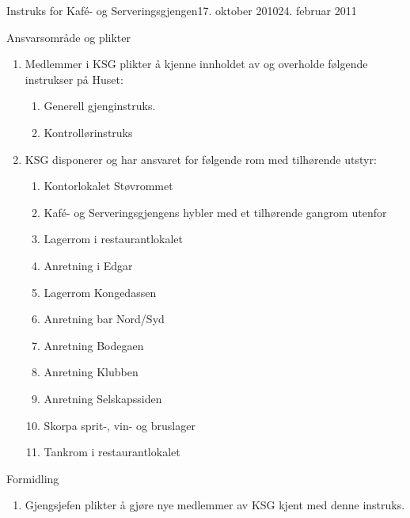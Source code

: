 \begin{instruks}{Instruks for Kaf\'e- og Serveringsgjengen}{17. oktober 2010}{24. februar 2011}
    \begin{instruksledd}{Ansvarsområde og plikter}
        \begin{enumerate}
            \item  Medlemmer i KSG plikter å kjenne innholdet av og overholde følgende instrukser på
                Huset:
                \begin{enumerate}
                    \item Generell gjenginstruks.
                    \item Kontrollørinstruks
                \end{enumerate}
            \item KSG disponerer og har ansvaret for følgende rom med tilhørende utstyr:
                \begin{enumerate}
                    \item Kontorlokalet Støvrommet
                    \item Kafé- og Serveringsgjengens hybler med et tilhørende gangrom utenfor
                    \item Lagerrom i restaurantlokalet
                    \item Anretning i Edgar
                    \item Lagerrom Kongedassen
                    \item Anretning bar Nord/Syd
                    \item Anretning Bodegaen
                    \item Anretning Klubben
                    \item Anretning Selskapssiden
                    \item Skorpa sprit-, vin- og bruslager
                    \item Tankrom i restaurantlokalet
                \end{enumerate}
        \end{enumerate}
    \end{instruksledd}

    \begin{instruksledd}{Formidling}
        \begin{enumerate}
            \item Gjengsjefen plikter å gjøre nye medlemmer av KSG kjent med denne instruks.
        \end{enumerate}
    \end{instruksledd}

\end{instruks}


